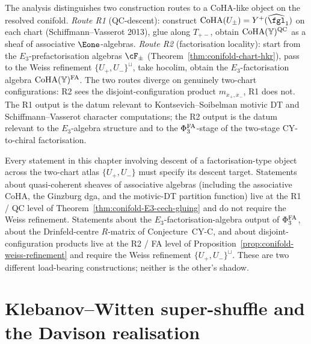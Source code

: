 \begin{remark}
\label{rem:conifold-R1-R2-routes}
The analysis distinguishes two construction routes to a CoHA-like object on the resolved conifold. \emph{Route R1} (QC-descent): construct $\mathrm{CoHA}(U_\pm) = Y^+(\widehat{\fgl}_1)$ on each chart (Schiffmann--Vasserot 2013), glue along $T_{+-}$, obtain $\mathrm{CoHA}(\mathbb{Y})^{\mathrm{QC}}$ as a sheaf of associative $\Eone$-algebras. \emph{Route R2} (factorisation locality): start from the $E_3$-prefactorisation algebras $\cF_\pm$ (Theorem~\ref{thm:conifold-chart-hkr}), pass to the Weiss refinement $\{U_+, U_-\}^\sqcup$, take hocolim, obtain the $E_3$-factorisation algebra $\mathrm{CoHA}(\mathbb{Y})^{\mathrm{FA}}$. The two routes diverge on genuinely two-chart configurations: R2 sees the disjoint-configuration product $m_{x_+, x_-}$, R1 does not. The R1 output is the datum relevant to Kontsevich--Soibelman motivic DT and Schiffmann--Vasserot character computations; the R2 output is the datum relevant to the $E_3$-algebra structure and to the $\Phi^{\mathrm{FA}}_3$-stage of the two-stage CY-to-chiral factorisation.
\end{remark}

\begin{remark}
\label{rem:weiss-scope-discipline}
Every statement in this chapter involving descent of a factorisation-type object across the two-chart atlas $\{U_+, U_-\}$ must specify its descent target. Statements about quasi-coherent sheaves of associative algebras (including the associative CoHA, the Ginzburg dga, and the motivic-DT partition function) live at the R1 / QC level of Theorem~\ref{thm:conifold-E3-cech-gluing} and do not require the Weiss refinement. Statements about the $E_3$-factorisation-algebra output of $\Phi^{\mathrm{FA}}_3$, about the Drinfeld-centre $R$-matrix of Conjecture~CY-C, and about disjoint-configuration products live at the R2 / FA level of Proposition~\ref{prop:conifold-weiss-refinement} and require the Weiss refinement $\{U_+, U_-\}^\sqcup$. These are two different load-bearing constructions; neither is the other's shadow.
\end{remark}





\section{Klebanov--Witten super-shuffle and the Davison realisation}
\label{sec:kw-super-shuffle}

